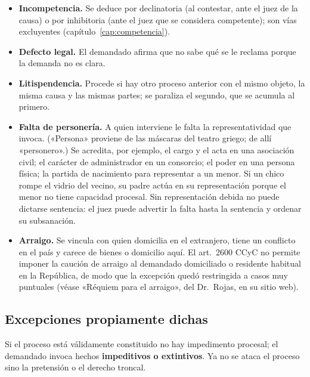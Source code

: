 \documentclass[12pt,oneside]{book}
\begin{document}
\begin{itemize}
\item \textbf{Incompetencia.} Se deduce por declinatoria (al contestar, ante el juez de la causa) o por inhibitoria (ante el juez que se considera competente); son vías excluyentes (capítulo~\ref{cap:competencia}).
\item \textbf{Defecto legal.} El demandado afirma que no sabe qué se le reclama porque la demanda no es clara.
\item \textbf{Litispendencia.} Procede si hay otro proceso anterior con el mismo objeto, la misma causa y las mismas partes; se paraliza el segundo, que se acumula al primero.
\item \textbf{Falta de personería.} A quien interviene le falta la representatividad que invoca. («Persona» proviene de las máscaras del teatro griego; de allí «personero».) Se acredita, por ejemplo, el cargo y el acta en una asociación civil; el carácter de administrador en un consorcio; el poder en una persona física; la partida de nacimiento para representar a un menor. Si un chico rompe el vidrio del vecino, su padre actúa en su representación porque el menor no tiene capacidad procesal. Sin representación debida no puede dictarse sentencia: el juez puede advertir la falta hasta la sentencia y ordenar su subsanación.
\item \textbf{Arraigo.} Se vincula con quien domicilia en el extranjero, tiene un conflicto en el país y carece de bienes o domicilio aquí. El art.~2600 CCyC no permite imponer la caución de arraigo al demandado domiciliado o residente habitual en la República, de modo que la excepción quedó restringida a casos muy puntuales (véase «Réquiem para el arraigo», del Dr.~Rojas, en su sitio web). %
\end{itemize}

\subsection{Excepciones propiamente dichas}

Si el proceso está válidamente constituido no hay impedimento procesal; el demandado invoca hechos \textbf{impeditivos o extintivos}. Ya no se ataca el proceso sino la pretensión o el derecho troncal.
\end{document}

